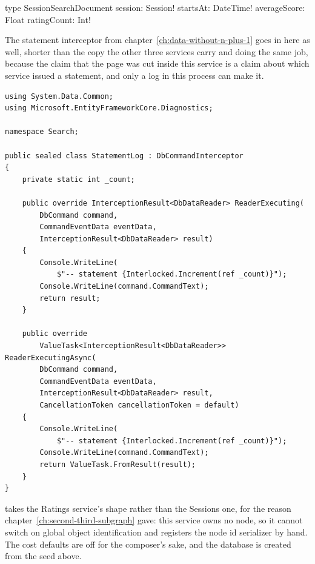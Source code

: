 \begin{graphqlsdl}
type SessionSearchDocument {
  session: Session!
  startsAt: DateTime!
  averageScore: Float
  ratingCount: Int!
}
\end{graphqlsdl}

%
The statement interceptor from chapter~\ref{ch:data-without-n-plus-1} goes in
here as well, shorter than the copy the other three services carry and doing
the same job, because the claim that the page was cut inside this service is
a claim about which service issued a statement, and only a log in this
process can make it.

\begin{verbatim}
using System.Data.Common;
using Microsoft.EntityFrameworkCore.Diagnostics;

namespace Search;

public sealed class StatementLog : DbCommandInterceptor
{
    private static int _count;

    public override InterceptionResult<DbDataReader> ReaderExecuting(
        DbCommand command,
        CommandEventData eventData,
        InterceptionResult<DbDataReader> result)
    {
        Console.WriteLine(
            $"-- statement {Interlocked.Increment(ref _count)}");
        Console.WriteLine(command.CommandText);
        return result;
    }

    public override
        ValueTask<InterceptionResult<DbDataReader>> ReaderExecutingAsync(
        DbCommand command,
        CommandEventData eventData,
        InterceptionResult<DbDataReader> result,
        CancellationToken cancellationToken = default)
    {
        Console.WriteLine(
            $"-- statement {Interlocked.Increment(ref _count)}");
        Console.WriteLine(command.CommandText);
        return ValueTask.FromResult(result);
    }
}
\end{verbatim}

 takes the Ratings service's shape rather than the Sessions
one, for the reason chapter~\ref{ch:second-third-subgraph} gave: this service
owns no node, so it cannot switch on global object identification and
registers the node id serializer by hand. The cost defaults are off for the
composer's sake, and the database is created from the seed above.

